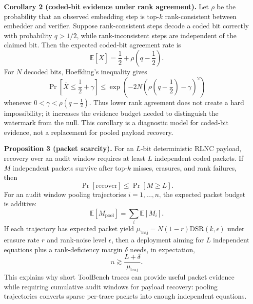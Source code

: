 \documentclass[conference,compsoc]{IEEEtran}
\begin{document}
\textbf{Corollary 2 (coded-bit evidence under rank agreement).}
Let $\rho$ be the probability that an observed embedding step is top-$k$ rank-consistent between embedder and verifier. Suppose rank-consistent steps decode a coded bit correctly with probability $q>1/2$, while rank-inconsistent steps are independent of the claimed bit. Then the expected coded-bit agreement rate is
\begin{equation}
  \mathbb{E}[\bar X]=\frac{1}{2}+\rho(q-\frac{1}{2}).
\end{equation}
For $N$ decoded bits, Hoeffding's inequality gives
\begin{equation}
  \Pr\!\left[\bar X \leq \frac{1}{2}+\gamma\right]
  \leq
  \exp\!\left(-2N\left(\rho(q-\frac{1}{2})-\gamma\right)^2\right)
\end{equation}
whenever $0<\gamma<\rho(q-\frac{1}{2})$. Thus lower rank agreement does not create a hard impossibility; it increases the evidence budget needed to distinguish the watermark from the null. This corollary is a diagnostic model for coded-bit evidence, not a replacement for pooled payload recovery.

\textbf{Proposition 3 (packet scarcity).}
For an $L$-bit deterministic RLNC payload, recovery over an audit window requires at least $L$ independent coded packets. If $M$ independent packets survive after top-$k$ misses, erasures, and rank failures, then
\begin{equation}
  \Pr[\mathrm{recover}] \leq \Pr[M\geq L].
\end{equation}
For an audit window pooling trajectories $i=1,\ldots,n$, the expected packet budget is additive:
\begin{equation}
  \mathbb{E}[M_{\mathrm{pool}}]=\sum_i \mathbb{E}[M_i].
\end{equation}
If each trajectory has expected packet yield $\mu_{\mathrm{traj}}=N(1-r)\mathrm{DSR}(k,\epsilon)$ under erasure rate $r$ and rank-noise level $\epsilon$, then a deployment aiming for $L$ independent equations plus a rank-deficiency margin $\delta$ needs, in expectation,
\begin{equation}
  n \gtrsim \frac{L+\delta}{\mu_{\mathrm{traj}}}.
\end{equation}
This explains why short ToolBench traces can provide useful packet evidence while requiring cumulative audit windows for payload recovery: pooling trajectories converts sparse per-trace packets into enough independent equations.
\end{document}
